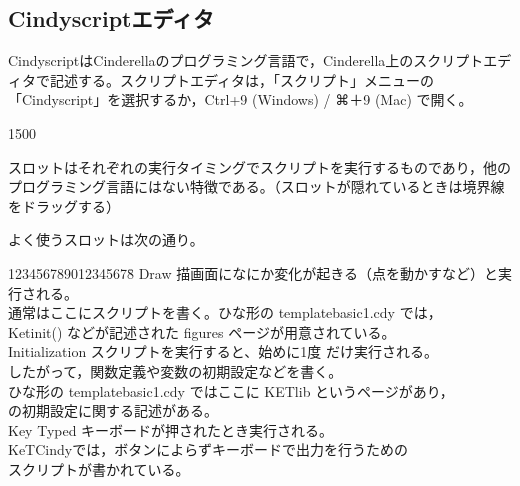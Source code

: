 \documentclass[papersize,a4paper,12pt,uplatex]{jsarticle}
\begin{document}
\subsection{Cindyscriptエディタ}
CindyscriptはCinderellaのプログラミング言語で，Cinderella上のスクリプトエディタで記述する。スクリプトエディタは，「スクリプト」メニューの「Cindyscript」を選択するか，Ctrl+9 (Windows) / ⌘＋9 (Mac) で開く。\\
\vspace{110mm}
\begin{layer}{150}{0}
\end{layer}

スロットはそれぞれの実行タイミングでスクリプトを実行するものであり，他のプログラミング言語にはない特徴である。（スロットが隠れているときは境界線をドラッグする）

よく使うスロットは次の通り。

\begin{tabbing}
123456789012345678\=\kill
Draw \>描画面になにか変化が起きる（点を動かすなど）と実行される。\\
 \>通常はここにスクリプトを書く。ひな形の templatebasic1.cdy では，\\
 \>Ketinit() などが記述された figures ページが用意されている。\\
Initialization \>スクリプトを実行すると、始めに1度 だけ実行される。\\
 \>したがって，関数定義や変数の初期設定などを書く。\\
 \>ひな形の templatebasic1.cdy ではここに KETlib というページがあり，\\
 \>\ketcindy の初期設定に関する記述がある。\\
Key Typed   \>キーボードが押されたとき実行される。\\
   \> KeTCindyでは，ボタンによらずキーボードで出力を行うための\\
   \>スクリプトが書かれている。
\end{tabbing}
\end{document}
